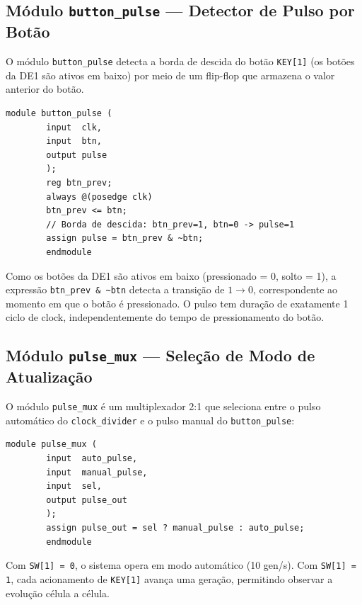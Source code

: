 \documentclass[12pt, a4paper]{article}
\begin{document}
	\subsection{Módulo \texttt{button\_pulse} --- Detector de Pulso por Botão}
	
	O módulo \texttt{button\_pulse} detecta a borda de descida do botão \texttt{KEY[1]}
	(os botões da DE1 são ativos em baixo) por meio de um flip-flop que armazena
	o valor anterior do botão.
	
	\begin{lstlisting}[style=verilog, caption={\texttt{button\_pulse.v} --- Detector de borda de descida para geração de pulso manual de atualização.}, label={lst:btnpulse}]
		module button_pulse (
		input  clk,
		input  btn,
		output pulse
		);
		reg btn_prev;
		always @(posedge clk)
		btn_prev <= btn;
		// Borda de descida: btn_prev=1, btn=0 -> pulse=1
		assign pulse = btn_prev & ~btn;
		endmodule
	\end{lstlisting}
	
	Como os botões da DE1 são ativos em baixo (pressionado = 0, solto = 1), a
	expressão \texttt{btn\_prev \& \textasciitilde btn} detecta a transição de
	$1 \to 0$, correspondente ao momento em que o botão é pressionado. O pulso
	tem duração de exatamente 1 ciclo de clock, independentemente do tempo de
	pressionamento do botão.
	
	\subsection{Módulo \texttt{pulse\_mux} --- Seleção de Modo de Atualização}
	
	O módulo \texttt{pulse\_mux} é um multiplexador 2:1 que seleciona entre o pulso
	automático do \texttt{clock\_divider} e o pulso manual do \texttt{button\_pulse}:
	
	\begin{lstlisting}[style=verilog, caption={\texttt{pulse\_mux.v} --- Seleção entre modo de atualização automático e manual.}, label={lst:pulsemux}]
		module pulse_mux (
		input  auto_pulse,
		input  manual_pulse,
		input  sel,
		output pulse_out
		);
		assign pulse_out = sel ? manual_pulse : auto_pulse;
		endmodule
	\end{lstlisting}
	
	Com \texttt{SW[1] = 0}, o sistema opera em modo automático (10 gen/s). Com
	\texttt{SW[1] = 1}, cada acionamento de \texttt{KEY[1]} avança uma geração,
	permitindo observar a evolução célula a célula.
	
\end{document}
